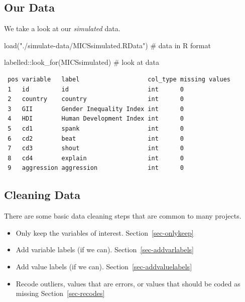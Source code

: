 \documentclass[
  letterpaper,
  DIV=11,
  numbers=noendperiod]{scrreprt}
\newenvironment{Shaded}{\begin{snugshade}}{\end{snugshade}}
\newcommand{\CommentTok}[1]{\textcolor[rgb]{0.37,0.37,0.37}{#1}}
\newcommand{\FunctionTok}[1]{\textcolor[rgb]{0.28,0.35,0.67}{#1}}
\newcommand{\NormalTok}[1]{\textcolor[rgb]{0.00,0.23,0.31}{#1}}
\newcommand{\SpecialCharTok}[1]{\textcolor[rgb]{0.37,0.37,0.37}{#1}}
\newcommand{\StringTok}[1]{\textcolor[rgb]{0.13,0.47,0.30}{#1}}
\providecommand{\tightlist}{%
  \setlength{\itemsep}{0pt}\setlength{\parskip}{0pt}}\usepackage{longtable,booktabs,array}
\begin{document}
\hypertarget{our-data}{%
\subsection{Our Data}\label{our-data}}

We take a look at our \emph{simulated} data.

\begin{Shaded}
\begin{Highlighting}[]
\FunctionTok{load}\NormalTok{(}\StringTok{"./simulate{-}data/MICSsimulated.RData"}\NormalTok{) }\CommentTok{\# data in R format}

\NormalTok{labelled}\SpecialCharTok{::}\FunctionTok{look\_for}\NormalTok{(MICSsimulated) }\CommentTok{\# look at data}
\end{Highlighting}
\end{Shaded}

\begin{verbatim}
 pos variable   label                   col_type missing values
 1   id         id                      int      0             
 2   country    country                 int      0             
 3   GII        Gender Inequality Index int      0             
 4   HDI        Human Development Index int      0             
 5   cd1        spank                   int      0             
 6   cd2        beat                    int      0             
 7   cd3        shout                   int      0             
 8   cd4        explain                 int      0             
 9   aggression aggression              int      0             
\end{verbatim}

\hypertarget{cleaning-data}{%
\subsection{Cleaning Data}\label{cleaning-data}}

There are some basic data cleaning steps that are common to many
projects.

\begin{itemize}
\tightlist
\item
  Only keep the variables of interest. Section~\ref{sec-onlykeep}
\item
  Add variable labels (if we can). Section~\ref{sec-addvarlabels}
\item
  Add value labels (if we can). Section~\ref{sec-addvaluelabels}
\item
  Recode outliers, values that are errors, or values that should be
  coded as missing Section~\ref{sec-recodes}
\end{itemize}
\end{document}
